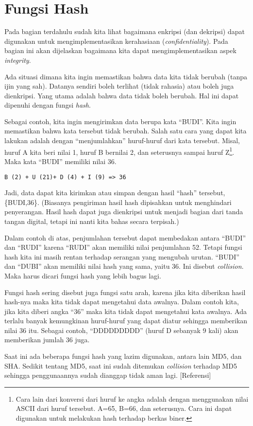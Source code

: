 \section{Fungsi Hash}
Pada bagian terdahulu sudah kita lihat bagaimana enkripsi (dan dekripsi) dapat digunakan untuk mengimplementasikan kerahasiaan ({\em confidentiality}). Pada bagian ini akan dijelaskan bagaimana kita dapat mengimplementasikan aspek {\em integrity}.

Ada situasi dimana kita ingin memastikan bahwa data kita tidak berubah (tanpa ijin yang sah). Datanya sendiri boleh terlihat (tidak rahasia) atau boleh juga dienkripsi. Yang utama adalah bahwa data tidak boleh berubah. Hal ini dapat dipenuhi dengan fungsi {\em hash}.

Sebagai contoh, kita ingin mengirimkan data berupa kata ``BUDI''. Kita ingin memastikan bahwa kata tersebut tidak berubah. Salah satu cara yang dapat kita lakukan adalah dengan ``menjumlahkan'' huruf-huruf dari kata tersebut. Misal, huruf A kita beri nilai 1, huruf B bernilai 2, dan seterusnya sampai huruf Z\footnote{Cara lain dari konversi dari huruf ke angka adalah dengan menggunakan nilai ASCII dari huruf tersebut. A=65, B=66, dan seterusnya. Cara ini dapat digunakan untuk melakukan hash terhadap berkas biner.}. Maka kata ``BUDI'' memiliki nilai 36.

\begin{verbatim}
B (2) + U (21)+ D (4) + I (9) => 36
\end{verbatim}

Jadi, data dapat kita kirimkan atau simpan dengan hasil ``hash'' tersebut, \{BUDI,36\}. (Biasanya pengiriman hasil hash dipisahkan untuk menghindari penyerangan. Hasil hash dapat juga dienkripsi untuk menjadi bagian dari tanda tangan digital, tetapi ini nanti kita bahas secara terpisah.)

Dalam contoh di atas, penjumlahan tersebut dapat membedakan antara ``BUDI'' dan ``RUDI'' karena ``RUDI'' akan memiliki nilai penjumlahan 52. Tetapi fungsi hash kita ini masih rentan terhadap serangan yang mengubah urutan. ``BUDI'' dan ``DUBI'' akan memiliki nilai hash yang sama, yaitu 36. Ini disebut {\em collision}. Maka harus dicari fungsi hash yang lebih bagus lagi.

Fungsi hash sering disebut juga fungsi satu arah, karena jika kita diberikan hasil hash-nya maka kita tidak dapat mengetahui data awalnya. Dalam contoh kita, jika kita diberi angka ``36'' maka kita tidak dapat mengetahui kata awalnya. Ada terlalu banyak kemungkinan huruf-huruf yang dapat diatur sehingga memberikan nilai 36 itu. Sebagai contoh, ``DDDDDDDDD'' (huruf D sebanyak 9 kali) akan memberikan jumlah 36 juga.

Saat ini ada beberapa fungsi hash yang lazim digunakan, antara lain MD5, dan SHA. Sedikit tentang MD5, saat ini sudah ditemukan {\em collision} terhadap MD5 sehingga penggunaannya sudah dianggap tidak aman lagi. [Referensi]
